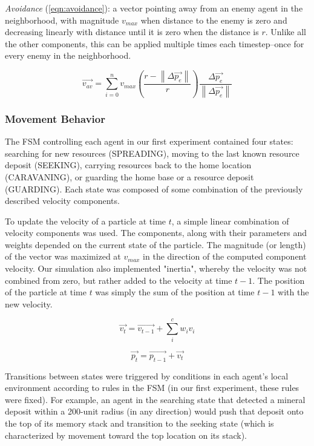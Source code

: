 \documentclass[12pt,journal,compsoc]{IEEEtran}
\begin{document}
\textit{Avoidance} (\ref{eqn:avoidance}): a vector pointing away from an enemy agent in the neighborhood, with magnitude $v_{max}$ when distance to the enemy is zero and decreasing linearly with distance until it is zero when the distance is $r$. Unlike all the other components, this can be applied multiple times each timestep--once for every enemy in the neighborhood.

\begin{equation}
    \vec { v_{ av } } =\sum _{i=0}^{n} {v_{ max } \left( \frac{r - \left\| \Delta \vec{p_e} \right\|} {r} \right) \frac { \Delta \vec { p_e }  }{ \left\| \Delta \vec { p_e }  \right\|  }}
    \label{eqn:avoidance}
\end{equation}

\subsubsection{Movement Behavior}

The FSM controlling each agent in our first experiment contained four states: searching for new resources (SPREADING), moving to the last known resource deposit (SEEKING), carrying resources back to the home location (CARAVANING), or guarding the home base or a resource deposit (GUARDING). Each state was composed of some combination of the previously described velocity components.

To update the velocity of a particle at time $t$, a simple linear combination of velocity components was used. The components, along with their parameters and weights depended on the current state of the particle. The magnitude (or length) of the vector was maximized at $v_{max}$ in the direction of the computed component velocity. Our simulation also implemented "inertia", whereby the velocity was not combined from zero, but rather added to the velocity at time $t-1$. The position of the particle at time $t$ was simply the sum of the position at time $t-1$ with the new velocity.

\begin{equation}
    \vec {v_t} =  \vec {v_{t-1}}+ \sum_i^c { w_i v_i}
    \label{eqn:velocity}
\end{equation}

\begin{equation}
    \vec {p_t} = \vec {p_{t-1}} + \vec {v_t}
    \label{eqn:position}
\end{equation}

Transitions between states were triggered by conditions in each agent's local environment according to rules in the FSM (in our first experiment, these rules were fixed). For example, an agent in the searching state that detected a mineral deposit within a 200-unit radius (in any direction) would push that deposit onto the top of its memory stack and transition to the seeking state (which is characterized by movement toward the top location on its stack).
\end{document}
